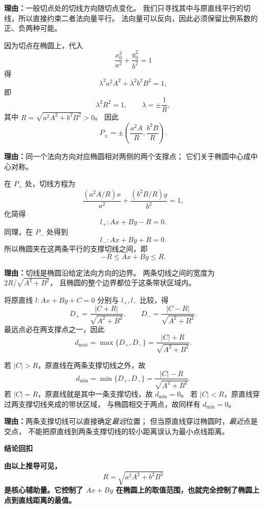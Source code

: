 \begin{proofbox}
\begin{description}[style=nextline, leftmargin=2.8em, labelsep=0.5em, itemsep=0.55em]
		      \par\textbf{理由：}一般切点处的切线方向随切点变化。
		      我们只寻找其中与原直线平行的切线，所以直接约束二者法向量平行。
		      法向量可以反向，因此必须保留比例系数的正、负两种可能。

		\item[\textbf{步骤二（联立椭圆方程，求出两个切点）：}]
		      因为切点在椭圆上，代入
		      \[
			      \frac{x_0^2}{a^2}+\frac{y_0^2}{b^2}=1
		      \]
		      得
		      \[
			      \lambda^2a^2A^2+\lambda^2b^2B^2=1,
		      \]
		      即
		      \[
			      \lambda^2R^2=1,\qquad
			      \lambda=\pm\frac1R,
		      \]
		      其中 \(R=\sqrt{a^2A^2+b^2B^2}>0\)。
		      因此
		      \[
			      \boxed{P_\pm=\pm\left(\frac{a^2A}{R},\frac{b^2B}{R}\right)}.
		      \]

		      \par\textbf{理由：}同一个法向方向对应椭圆相对两侧的两个支撑点；
		      它们关于椭圆中心成中心对称。

		\item[\textbf{步骤三（将两个切点代回切线方程）：}]
		      在 \(P_+\) 处，切线方程为
		      \[
			      \frac{(a^2A/R)x}{a^2}+\frac{(b^2B/R)y}{b^2}=1,
		      \]
		      化简得
		      \[
			      l_+:Ax+By-R=0.
		      \]
		      同理，在 \(P_-\) 处得到
		      \[
			      l_-:Ax+By+R=0.
		      \]
		      所以椭圆夹在这两条平行的支撑切线之间，即
		      \[
			      -R\le Ax+By\le R.
		      \]

		      \par\textbf{理由：}切线是椭圆沿给定法向方向的边界。
		      两条切线之间的宽度为 \(2R/\sqrt{A^2+B^2}\)，
		      且椭圆的整个边界都位于这条带状区域内。

		\item[\textbf{步骤四（平行直线间距离，分类求最值）：}]
		      将原直线 \(l:Ax+By+C=0\) 分别与 \(l_+,l_-\) 比较，得
		      \[
			      D_+=\frac{|C+R|}{\sqrt{A^2+B^2}},\qquad
			      D_-=\frac{|C-R|}{\sqrt{A^2+B^2}}.
		      \]
		      最远点必在两支撑点之一，因此
		      \[
			      d_{\max}=\max\{D_+,D_-\}
			      =\frac{|C|+R}{\sqrt{A^2+B^2}}.
		      \]

		      若 \(|C|>R\)，原直线在两条支撑切线之外，故
		      \[
			      d_{\min}=\min\{D_+,D_-\}
			      =\frac{|C|-R}{\sqrt{A^2+B^2}}.
		      \]
		      若 \(|C|=R\)，原直线就是其中一条支撑切线，故 \(d_{\min}=0\)。
		      若 \(|C|<R\)，原直线穿过两支撑切线夹成的带状区域，
		      与椭圆相交于两点，故同样有 \(d_{\min}=0\)。

		      \par\textbf{理由：}两条支撑切线可以直接确定\emph{最远}位置；
		      但当原直线穿过椭圆时，\emph{最近}点是交点，
		      不能把原直线到两条支撑切线的较小距离误认为最小点线距离。
	\end{description}

	\medskip

	\textbf{\textcolor{CProof}{结论回扣}}

	\textbf{由以上推导可见，}
	\[
		R=\sqrt{a^2A^2+b^2B^2}
	\]
	\textbf{是核心辅助量。它控制了 \(Ax+By\) 在椭圆上的取值范围，也就完全控制了椭圆上点到直线距离的最值。}

\end{proofbox}